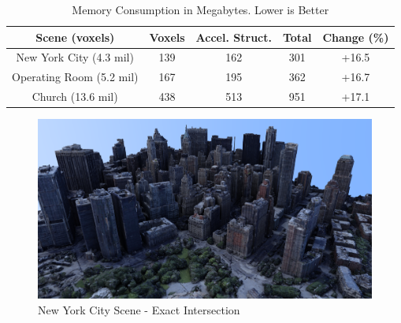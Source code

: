 \documentclass[12pt]{article}
\begin{document}



\begin{table}[H]
    \centering
    \caption{Memory Consumption in Megabytes. Lower is Better}
    \vspace{0.5cm}
    \label{tab:Memory-Consumption}
    \begin{tabular}{c||c|c|c|c|}
        Scene (voxels)           & Voxels & Accel. Struct. & Total & Change (\%) \\ \toprule
        New York City (4.3 mil)  & 139    & 162            & 301   & +16.5       \\
        Operating Room (5.2 mil) & 167    & 195            & 362   & +16.7       \\
        Church (13.6 mil)        & 438    & 513            & 951   & +17.1       \\
    \end{tabular}
\end{table}

\begin{figure}[H]
    \begin{center}
        \includegraphics[scale=0.25]{NewYorkCity}
    \end{center}
    \caption{New York City Scene - Exact Intersection}
    \label{fig:NewYorkCity}
\end{figure}
\end{document}
